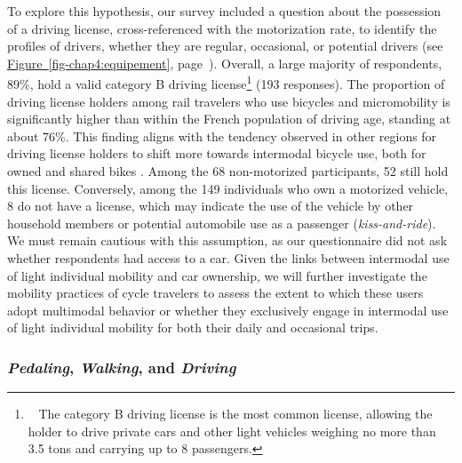 \begin{refsegment}
To explore this hypothesis, our survey included a question about the possession of a driving license, cross-referenced with the motorization rate, to identify the profiles of drivers, whether they are regular, occasional, or potential drivers (see \hyperref[fig-chap4:equipement]{Figure~\ref{fig-chap4:equipement}}, page~\pageref{fig-chap4:equipement}). Overall, a large majority of respondents, 89\%, hold a valid category B driving license\footnote{~
    The category B driving license is the most common license, allowing the holder to drive private cars and other light vehicles weighing no more than 3.5 tons and carrying up to 8 passengers.
} (193 responses). The proportion of driving license holders among rail travelers who use bicycles and micromobility is significantly higher than within the French population of driving age, standing at about 76\%. This finding aligns with the tendency observed in other regions for driving license holders to shift more towards intermodal bicycle use, both for owned and shared bikes \textcolor{blue}{\autocites[111]{bachand-marleau_much-anticipated_2011}[215]{lin_built_2018}[7]{hamidi_shaping_2020}}. Among the 68 non-motorized participants, 52 still hold this license. Conversely, among the 149 individuals who own a motorized vehicle, 8 do not have a license, which may indicate the use of the vehicle by other household members or potential automobile use as a passenger (\textsl{kiss-and-ride}). We must remain cautious with this assumption, as our questionnaire did not ask whether respondents had access to a car. Given the links between intermodal use of light individual mobility and car ownership, we will further investigate the mobility practices of cycle travelers to assess the extent to which these users adopt multimodal behavior or whether they exclusively engage in intermodal use of light individual mobility for both their daily and occasional trips.%

\subsubsection*{\textsl{Pedaling}, \textsl{Walking}, and \textsl{Driving}
    \label{chap4:capital-mobilite-habitudes}
    }


\end{refsegment}
